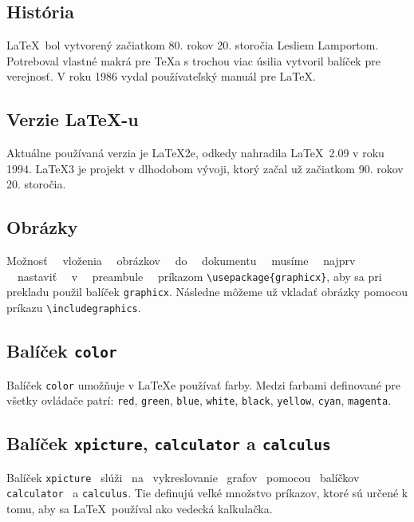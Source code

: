 \documentclass[a4paper, 11pt]{article}
\begin{document}
    \subsection{História}
        \LaTeX \ bol vytvorený začiatkom 80. rokov 20. storočia Lesliem Lamportom. Potreboval vlastné makrá pre \TeX a s trochou viac úsilia vytvoril balíček pre verejnosť. V roku 1986 vydal používateľský manuál pre \LaTeX. \cite{Lamport:1994}
        
    \subsection{Verzie \LaTeX -u}
        Aktuálne používaná verzia je \LaTeX 2e, odkedy nahradila \LaTeX \ 2.09 v roku 1994. \LaTeX 3 je projekt v dlhodobom vývoji, ktorý začal už začiatkom 90. rokov 20. storočia. \cite{Versions}
    
    \subsection{Obrázky}
         Možnosť ~~vloženia ~~obrázkov ~~do ~~dokumentu ~~musíme ~~najprv ~~nastaviť ~~v ~~preambule ~~príkazom \verb!\usepackage{graphicx}!, aby sa pri prekladu použil balíček \verb!graphicx!. Následne môžeme už vkladať obrázky pomocou príkazu \verb!\includegraphics!. \cite{Cerny:2010}
         
    \subsection{Balíček \texttt{color}}
        Balíček \texttt{color} umožňuje v \LaTeX e používať farby. Medzi farbami definované pre všetky ovládače patrí: \texttt{red}, \texttt{green}, \texttt{blue}, \texttt{white}, \texttt{black}, \texttt{yellow}, \texttt{cyan}, \texttt{magenta}. \cite{Bunka:2008}
        
    \subsection{Balíček \texttt{xpicture}, \texttt{calculator} a \texttt{calculus}}
        Balíček \texttt{xpicture} ~slúži ~na ~vykreslovanie ~grafov ~pomocou ~balíčkov \texttt{calculator} ~a \texttt{calculus}. \cite{Capilla:2013} Tie definujú veľké množstvo príkazov, ktoré sú určené k tomu, aby sa \LaTeX \ používal ako vedecká kalkulačka. \cite{Capilla:2012}
        
\newpage

\renewcommand{\refname}{Literatura}

\end{document}
